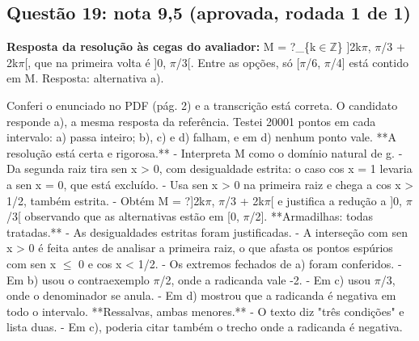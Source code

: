 \documentclass{article}%
\begin{document}
\subsection*{Questão 19: nota 9,5 (aprovada, rodada 1 de 1)}%
\textbf{Resposta da resolução às cegas do avaliador:} M = ?\_\{k$\in$$\mathbb{Z}$\} {]}2k$\pi$, $\pi$/3 + 2k$\pi${[}, que na primeira volta é {]}0, $\pi$/3{[}. Entre as opções, só {[}$\pi$/6, $\pi$/4{]} está contido em M. Resposta: alternativa a).\par %
Conferi o enunciado no PDF (pág. 2) e a transcrição está correta. O candidato responde a), a mesma resposta da referência. Testei 20001 pontos em cada intervalo: a) passa inteiro; b), c) e d) falham, e em d) nenhum ponto vale.\newline%
\newline%
**A resolução está certa e rigorosa.**\newline%
{-} Interpreta M como o domínio natural de g.\newline%
{-} Da segunda raiz tira sen x > 0, com desigualdade estrita: o caso cos x = 1 levaria a sen x = 0, que está excluído.\newline%
{-} Usa sen x > 0 na primeira raiz e chega a cos x > 1/2, também estrita.\newline%
{-} Obtém M = ?{]}2k$\pi$, $\pi$/3 + 2k$\pi${[} e justifica a redução a {]}0, $\pi$/3{[} observando que as alternativas estão em {[}0, $\pi$/2{]}.\newline%
\newline%
**Armadilhas: todas tratadas.**\newline%
{-} As desigualdades estritas foram justificadas.\newline%
{-} A interseção com sen x > 0 é feita antes de analisar a primeira raiz, o que afasta os pontos espúrios com sen x $\leq$ 0 e cos x < 1/2.\newline%
{-} Os extremos fechados de a) foram conferidos.\newline%
{-} Em b) usou o contraexemplo $\pi$/2, onde a radicanda vale -2.\newline%
{-} Em c) usou $\pi$/3, onde o denominador se anula.\newline%
{-} Em d) mostrou que a radicanda é negativa em todo o intervalo.\newline%
\newline%
**Ressalvas, ambas menores.**\newline%
{-} O texto diz "três condições" e lista duas.\newline%
{-} Em c), poderia citar também o trecho onde a radicanda é negativa.\newline%
$$
\end{document}
